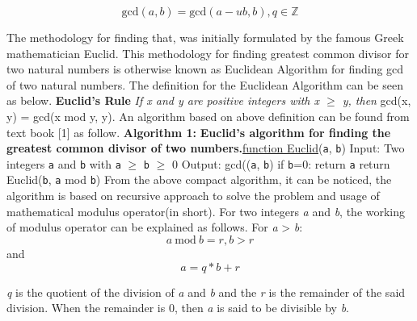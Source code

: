 \documentclass[conference,compsoc]{IEEEtran}
\newcommand{\Z}{{\mathbb Z}}
\newcommand{\var}[1]{\textit{#1}}
\newcommand{\progvar}[1]{\texttt{#1}}
\renewcommand{\mod}{\text{mod}}
\renewcommand{\gcd}{\text{gcd}}
\begin{document}
\begin{equation} \label{eq:gcd_mul_difference}
\gcd(a,b) = \gcd(a-ub,b), q\in\Z
\end{equation}

The methodology for finding that, was initially formulated by the famous Greek mathematician Euclid. This methodology for finding greatest common divisor for two natural numbers is otherwise known as Euclidean Algorithm for finding gcd of two 
natural numbers. The definition for the Euclidean Algorithm can be seen as below.
\newline \newline \textbf {Euclid's Rule} \textit {If x and y are positive integers with x $\geq$ y,
 then} \break \vspace{0mm} \hspace{4cm} gcd(x, y) = gcd(x mod y, y).
\newline 
\newline An algorithm based on above definition can be found from text book [1] as follow.
\newline \textbf{Algorithm 1:}
\newline \textbf {Euclid's algorithm for finding the greatest common divisor of two numbers.}\newline \underline {function Euclid}(\progvar{a}, \progvar{b})
\newline Input: Two integers \progvar{a} and \progvar{b} with \progvar{a} $\geq$ \progvar{b} $\geq$ 0 
\newline Output: gcd((\progvar{a}, \progvar{b})
\newline
\newline if \progvar{b}=0: return \progvar{a}
\newline return Euclid(\progvar{b}, \progvar{a} mod \progvar{b})
\newline 
\newline From the above compact algorithm, it can be noticed, the algorithm is based on recursive approach to solve the problem and usage of mathematical modulus operator(\mod in short).
For two integers \var{a} and \var{b}, the working of modulus operator can be explained as follows.
For \var{a} > \var{b}:
\begin{equation} \label{eq:gcd_modulus_1}
a \> \mod \> b = r,  b > r
\end{equation}
and
\begin{equation} \label{eq:gcd_modulus_2}
a = q * b + r
\end{equation}

\var{q} is the quotient of the division of \var{a} and \var{b} and the \var{r} is the remainder of the said division. When the remainder is 0, then \var{a} is said to be divisible by \var{b}.
\end{document}
